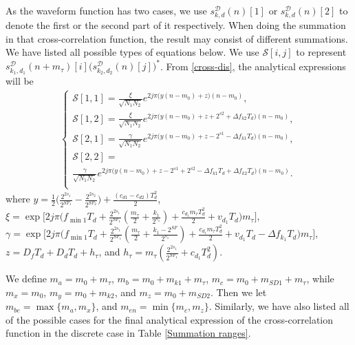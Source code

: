 \documentclass{IEEEtaes}
\theoremstyle{plain}
\begin{document}
As the waveform function has two cases, we use $s^\mathcal{D} _{k,d}(n)[1]$ or $s^\mathcal{D} _{k,d}(n)[2]$ to denote the first or the second part of it respectively. 
When doing the summation in that cross-correlation function, the result may consist of different summations. We have listed all possible types of equations below. We use $\mathcal{S}[i,j]$ to represent $s^\mathcal{D}_{k_1,d_1}(n+m_\tau)[i]\Big(s^\mathcal{D}_{k_2,d_2}(n)[j]\Big)^*$. From \eqref{cross-dis}, the analytical expressions will be 
\begin{equation}
  \label{four types}
  \begin{aligned}
    \begin{cases}
      \mathcal{S}[1,1]
           = \frac{\xi}{\sqrt{N_1 N_2}}e^{2j\pi\Big(y(n-m_0)+z\Big)(n-m_0)},\\
      \mathcal{S}[1,2]
           = \frac{\xi}{\sqrt{N_1 N_2}}e^{2j\pi\Big(y(n-m_0)+z+2^{s2}+\Delta f_{k2}T_d\Big)(n-m_0)},\\
      \mathcal{S}[2,1]
           = \frac{\gamma}{\sqrt{N_1 N_2}}e^{2j\pi\Big(y(n-m_0)+z-2^{s1}-\Delta f_{k1}T_d\Big)(n-m_0)},\\
      \mathcal{S}[2,2] = \\
            \frac{\gamma}{\sqrt{N_1 N_2}}e^{2j\pi\Big(y(n-m_0)+z-2^{s1}+2^{s2}-\Delta f_{k1}T_d+\Delta f_{k2}T_d\Big)(n-m_0)}.\\
      \end{cases}      
  \end{aligned}
\end{equation}
where $y \!=\! \frac{1}{2}\Big(\frac{2^{2s_1}}{2^{SF_1}}-\frac{2^{2s_2}}{2^{SF_2}}\Big) +\frac{(c_{d1}-c_{d2})T_d^2}{2}$, $\xi \!=\! \exp\Big[2j\pi \big(f_{\min1}T_d+\frac{2^{2s_1}}{ 2^{SF_1}}(\frac{m_{\tau}}{2}+\frac{k_1}{2^{s_1}})+\frac{c_{d_1}m_{\tau}T_d^2}{2}+v_{d_1}T_d\big)m_\tau\Big]$, $\gamma = \exp\Big[2j\pi \big(f_{\min1}T_d+\frac{2^{2s_1}}{ 2^{SF_1}}(\frac{m_{\tau}}{2}+\frac{k_1-2^{SF}}{2^{s_1}})+\frac{c_{d_1}m_{\tau}T_d^2}{2}+v_{d_1}T_d-\Delta f_{k_1}T_d\big) m_\tau\Big]$, $z = D_f T_d  +D_d T_d+h_{\tau}$, and $h_{\tau} = m_\tau(\frac{2^{2s_1}}{2^{SF_1}} +c_{d_1} T_d^2)$.%

We define $m_{\textit{a}} = m_0+m_\tau$, $m_{\textit{b}} = m_0+m_{k1}+m_\tau$, $m_{\textit{c}} = m_0+m_{\textit{SD}1}+m_\tau$, while $m_{\textit{x}} = m_0$, $m_{\textit{y}} = m_0+m_{k2}$, and $m_{\textit{z}} = m_0+m_{\textit{SD}2}$. Then we let $m_{\textit{be}}=\max\{m_{\textit{a}},m_{\textit{x}}\}$, and $m_{\textit{en}} = \min\{m_{\textit{c}},m_{\textit{z}}\}$. Similarly, we have also listed all of the possible cases for the final analytical expression of the cross-correlation function in the discrete case in Table \ref{Summation ranges}. 
\end{document}
